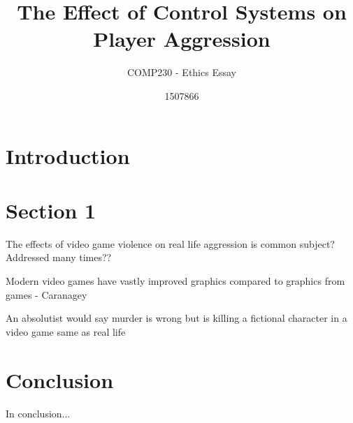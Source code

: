 \documentclass{scrartcl}
\title{The Effect of Control Systems on Player Aggression }
\subtitle{COMP230 - Ethics Essay}
\author{1507866}
\begin{document}
	
\maketitle
	
	
\section{Introduction}

\section{Section 1}
The effects of video game violence on real life aggression is common subject? Addressed many times??

Modern video games have vastly improved graphics compared to graphics from games - Caranagey 

An absolutist would say murder is wrong but is killing a fictional character in a video game same as real life



\section{Conclusion}
In conclusion...

	


	
\end{document}
